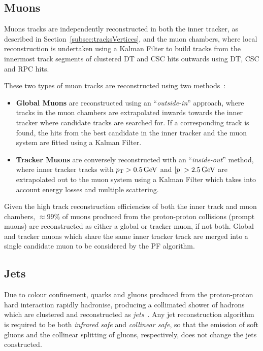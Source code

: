 {\subsection{Muons}\label{subsec:muons}
Muons tracks are independently reconstructed in both the inner tracker, as described in Section~\ref{subsec:tracksVertices}, and the muon chambers, where local reconstruction is undertaken using a Kalman Filter to build tracks from the innermost track segments of clustered DT and CSC hits outwards using DT, CSC and RPC hits.

These two types of muon tracks are reconstructed using two methods~\cite{Chatrchyan:2012xi}:
\begin{itemize}
\item \textbf{Global Muons} are reconstructed using an ``\emph{outside-in}'' approach, where tracks in the muon chambers are extrapolated inwards towards the inner tracker where candidate tracks are searched for.
If a corresponding track is found, the hits from the best candidate in the inner tracker and the muon system are fitted using a Kalman Filter.
\item \textbf{Tracker Muons} are conversely reconstructed with an ``\emph{inside-out}'' method, where inner tracker tracks with $p_{\mathrm{T}} > 0.5\,\text{Ge\hspace{-.08em}V}$ and $|p| > 2.5\,\text{Ge\hspace{-.08em}V}$ are extrapolated out to the muon system using a Kalman Filter which takes into account energy losses and multiple scattering.
\end{itemize}

Given the high track reconstruction efficiencies of both the inner track and muon chambers, $\approx 99\%$ of muons produced from the proton-proton collisions (prompt muons) are reconstructed as either a global or tracker muon, if not both.
Global and tracker muons which share the same inner tracker track are merged into a single candidate muon to be considered by the PF algorithm.

\subsection{Jets}
Due to colour confinement, quarks and gluons produced from the proton-proton hard interaction rapidly hadronise, producing a collimated shower of hadrons which are clustered and reconstructed as \emph{jets}~\cite{Salam:2009jx}.
Any jet reconstruction algorithm is required to be both \emph{infrared safe} and \emph{collinear safe}, \ie so that the emission of soft gluons and the collinear splitting of gluons, respectively, does not change the jets constructed.

}

